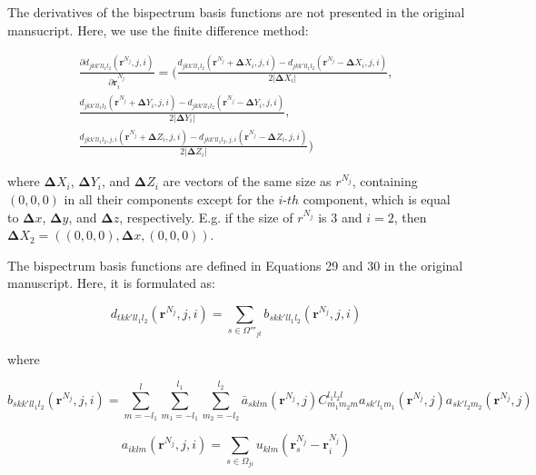 \documentclass[12pt]{article}
\begin{document}
The derivatives of the bispectrum basis functions are not presented in the original mansucript. Here, we use the finite difference method:

\begin{equation}
\begin{split}
     \frac{\partial d_{jkk'l{l_1}{l_2}}(\bm r^{N_j}, j, i)}{\partial \bm r^{N_j}_i} =  
 \bigg( \frac{ d_{jkk'l{l_1}{l_2}}(\bm r^{N_j} + \bm \Delta X_i, j, i) - d_{jkk'l{l_1}{l_2}}(\bm r^{N_j} - \bm \Delta X_i, j, i) } {2 |\bm \Delta X_i|}, \\
          \frac{ d_{jkk'l{l_1}{l_2}}(\bm r^{N_j} + \bm \Delta Y_i, j, i) - d_{jkk'l{l_1}{l_2}}(\bm r^{N_j} - \bm \Delta Y_i, j, i) } {2 |\bm \Delta Y_i|},\\
          \frac{ d_{jkk'l{l_1}{l_2}, j, i}(\bm r^{N_j} + \bm \Delta Z_i, j, i) - d_{jkk'l{l_1}{l_2}, j, i}(\bm r^{N_j} - \bm \Delta Z_i, j, i) } {2 |\bm \Delta Z_i|} \bigg)
\end{split}
\end{equation}

where $\bm \Delta X_i$, $\bm \Delta Y_i$, and $\bm \Delta Z_i$ are vectors of the same size as $r^{N_j}$, containing $(0,0,0)$ in all their components except for the $i$-$th$ component, which is equal to $\bm \Delta x$, $\bm \Delta y$, and $\bm \Delta z$, respectively. E.g. if the size of $r^{N_j}$ is $3$ and $i = 2$, then $\bm \Delta X_2 = ( (0,0,0), \bm \Delta x, (0,0,0))$.

The bispectrum basis functions are defined in Equations 29 and 30 in the original manuscript. Here, it is formulated as:

\begin{equation}
    \label{eq:derd}
    d_{tkk'l{l_1}{l_2}}(\bm r^{N_j}, j, i) = \sum_{s \in \Omega'''_{jt}} b_{skk'l{l_1}{l_2}}(\bm r^{N_j}, j, i)
\end{equation}

where 

\begin{equation}
    b_{skk'l{l_1}{l_2}}(\bm r^{N_j}, j, i) = \sum_{m=-{l_1}}^l
     \sum_{m_1=-{l_1}}^{l_1}
     \sum_{m_2=-l_2}^{l_2}
     \bar{a}_{sklm}(\bm r^{N_j}, j)
     C_{{m_1}{m_2}m}^{{l_1}{l_2}l}
     a_{sk'{l_1}{m_1}}(\bm r^{N_j}, j)
     a_{sk'{l_2}{m_2}}(\bm r^{N_j}, j)
\end{equation}

\begin{equation}
    a_{iklm}(\bm r^{N_j}, j, i) = \sum_{s \in \Omega_{ji}} u_{klm}(\bm r^{N_j}_s -\bm r^{N_j}_i)
\end{equation}
\end{document}
